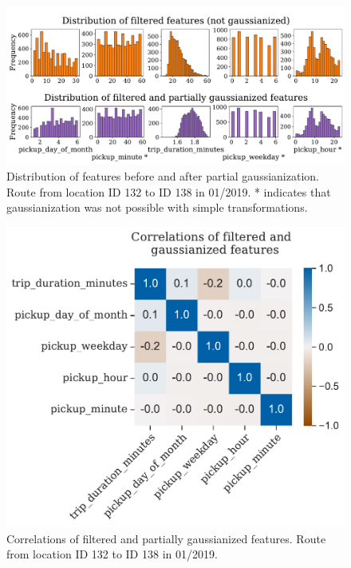 \documentclass{article}
\begin{document}
\begin{figure}
  \setlength{}
  \centering
  \includegraphics[scale=0.38]{fig/feature_distributions.pdf}
  \caption{Distribution of features before and after partial gaussianization. Route from location ID 132 to ID 138 in 01/2019. * indicates that gaussianization was not possible with simple transformations.}
  \label{fig:feature_distributions}
\end{figure}
\begin{figure}
  \setlength{}
  \centering
  \includegraphics[scale=0.45]{fig/correlations_gaussianized_columns_route_132_138.pdf}
  \caption{Correlations of filtered and partially gaussianized features. Route from location ID 132 to ID 138 in 01/2019.}
  \label{fig:correlation_matrix}
\end{figure}
\end{document}
